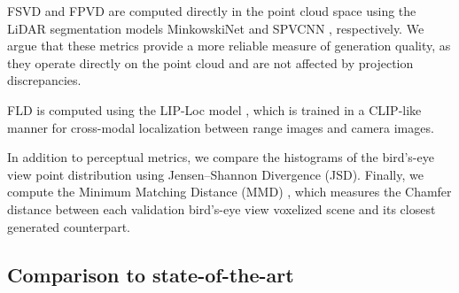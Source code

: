 FSVD and FPVD are computed directly in the point cloud space using the LiDAR segmentation models MinkowskiNet \cite{choy2019minknet} and SPVCNN \cite{spvnas}, respectively. 
We argue that these metrics provide a more reliable measure of generation quality, as they operate directly on the point cloud and are not affected by projection discrepancies.

FLD is computed using the LIP-Loc model \cite{puligilla_lip-loc_2024}, which is trained in a CLIP-like manner for cross-modal localization between range images and camera images.

In addition to perceptual metrics, we compare the histograms of the bird’s-eye view point distribution using Jensen–Shannon Divergence (JSD). 
Finally, we compute the Minimum Matching Distance (MMD) \cite{ran_towards_2024}, which measures the Chamfer distance between each validation bird's-eye view voxelized scene and its closest generated counterpart.

\subsection{Comparison to state-of-the-art}


